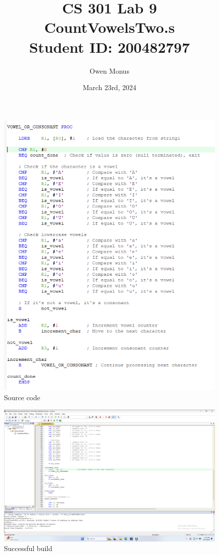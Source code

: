 \documentclass{article}
\begin{document}
\title{CS 301 Lab 9\\[0.5cm]\large CountVowelsTwo.s\\[0.5cm]\large Student ID: 200482797}
\author{Owen Monus}
\date{March 23rd, 2024}

\maketitle

\pagebreak

\begin{figure}
\caption{Source code}
\includegraphics[width=\textwidth]{../Images/count vowels source code.png}
\end{figure}

\begin{figure}
\caption{Successful build}
\includegraphics[width=\textwidth]{../Images/count vowels build.png}
\end{figure}
\end{document}
